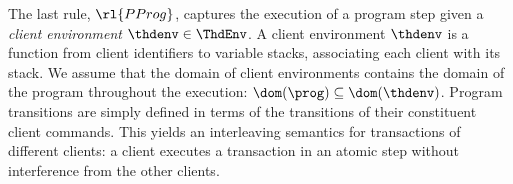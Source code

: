 The last rule, \( \rl{PProg} \), captures the execution of a program step 
given a \emph{client environment} $\thdenv \in \ThdEnv$.
A client environment $\thdenv$ is a function from client identifiers to variable stacks, associating each client with its stack. 
We assume that the domain of client environments contains 
the domain of the program throughout the execution: 
$\dom(\prog) \subseteq \dom(\thdenv)$.
Program transitions are simply defined in terms of the transitions of
their constituent client commands. 
This yields an interleaving semantics for transactions of different clients:  
a client executes a transaction in an atomic step without
interference from the  other clients. 
